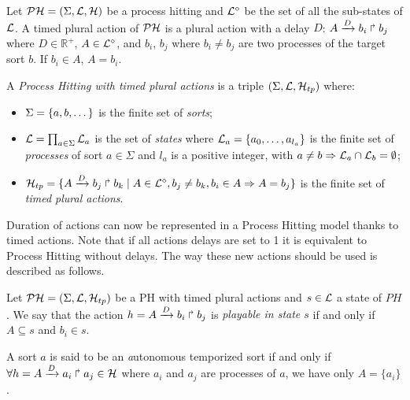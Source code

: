 \begin{definition}
\label{def:TimedAction}
\label{def:TimedAction}
Let $\mathcal{PH} = (\Sigma,\mathcal{L},\mathcal{H})$ be a process hitting and $\mathcal{L}^{\diamond}$ be the set of all the sub-states of $\mathcal{L}$.
A timed plural action of $\mathcal{PH}$ is a plural action with a delay $D$: $A\xrightarrow{D} b_i \Rsh b_j$ where $D \in \mathds{R}^+$, $A \in \mathcal{L}^{\diamond}$, and $b_i$, $b_j$ where  $b_i \not = b_j$ are two processes of the target sort $b$. If $b_i \in A$, $A=b_i$.
\end{definition}

\begin{definition}\label{def:PH-plural}
  A \emph{Process Hitting with timed plural actions} is a triple $(\Sigma,\mathcal{L},\mathcal{H}_{tp})$ where:
  \begin{itemize}
    \item  $\Sigma = \{a,b,\dots\}$ is the finite set of \emph{sorts};
    \item  $\mathcal{L} = \prod_{a\in\Sigma} \mathcal{L}_a$ is the set of \emph{states} where
      $\mathcal{L}_a = \{a_0,\dots,a_{l_a}\}$
      is the finite set of \emph{processes} of sort $a\in\Sigma$
      and $l_a$ is a positive integer, with $a\neq b\Rightarrow \mathcal{L}_a \cap \mathcal{L}_b = \emptyset$;
    \item  $\mathcal{H}_{tp} = \{ A\xrightarrow{D} b_j \Rsh b_k  \mid A \in \mathcal{L}^{\diamond}, b_j\neq b_k, b_i \in A \Rightarrow A=b_j\}$
      is the finite set of \emph{timed plural actions}.
  \end{itemize}
\end{definition}

Duration of actions can now be represented in a Process Hitting model thanks to timed actions.
Note that if all actions delays are set to 1 it is equivalent to Process Hitting without delays.
The way these new actions should be used is described as follows.

\begin{definition} 
\label{def:playableAction}
Let $\mathcal{PH} = (\Sigma,\mathcal{L},\mathcal{H}_{tp})$ be a PH with timed plural actions and $s \in \mathcal{L}$ a state of $PH$.
We say that the action $h = A\xrightarrow{D} b_i \Rsh b_j$
is \emph{playable in state $s$} if and only if
$A \subseteq s$ and $b_i \in s$. %
\end{definition}

\begin{definition}
\label{def:TempSort}
A sort $a$ is said to be an {\emph autonomous temporized sort} if and only if $\forall h = A\xrightarrow{D} a_i \Rsh a_j \in \mathcal{H}$  where $a_i$ and $a_j$ are processes of $a$, we have only $A = \{a_i\}$.
\end{definition}

